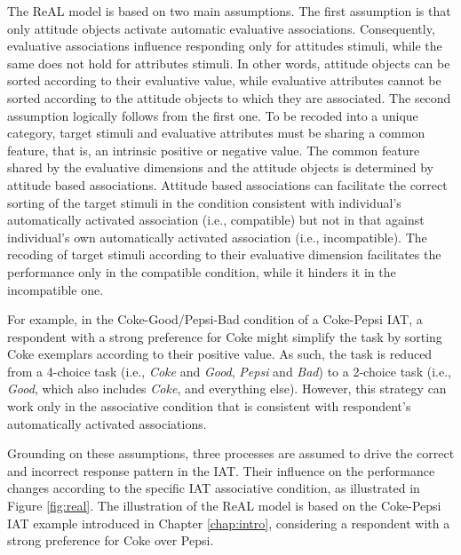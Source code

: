 \documentclass[12pt]{book}
\begin{document}
The ReAL model is based on two main assumptions. 
The first assumption is that only attitude objects activate automatic evaluative associations. Consequently, evaluative associations influence responding only for attitudes stimuli, while the same does not hold for attributes stimuli. In other words, attitude objects can be sorted according to their evaluative value, while evaluative attributes cannot be sorted according to the attitude objects to which they are associated.
The second assumption logically follows from the first one. To be recoded into a unique category, target stimuli and evaluative attributes must be sharing a common feature, that is, an intrinsic positive or negative value. The common feature shared by the evaluative dimensions and the attitude objects is determined by attitude based associations.
Attitude based associations can facilitate the correct sorting of the target stimuli in the condition consistent with individual's automatically activated association (i.e., compatible) but not in that against individual's own automatically activated association (i.e., incompatible). The recoding of target stimuli according to their evaluative dimension facilitates the performance only in the compatible condition, while it hinders it in the incompatible one.

For example, in the Coke-Good/Pepsi-Bad condition of a Coke-Pepsi IAT, a respondent with a strong preference for Coke might simplify the task by sorting Coke exemplars according to their positive value. 
As such, the task is reduced from a 4-choice task (i.e., \emph{Coke} and \emph{Good}, \emph{Pepsi} and \emph{Bad}) to a 2-choice task (i.e., \emph{Good}, which also includes \emph{Coke}, and everything else). However, this strategy can work only in the associative condition that is consistent with respondent's automatically activated associations.

Grounding on these assumptions, three processes are assumed to drive the correct and incorrect response pattern in the IAT. Their influence on the performance changes according to the specific IAT associative condition, as illustrated in Figure \ref{fig:real}. The illustration of the ReAL model is based on the Coke-Pepsi IAT example introduced in Chapter \ref{chap:intro}, considering a respondent with a strong preference for Coke over Pepsi.
\end{document}
